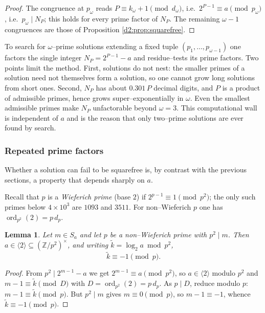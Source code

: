 \documentclass[a4paper]{article}
\theoremstyle{plain}
\newtheorem{lemma}{Lemma}[subsection]
\theoremstyle{definition}
\theoremstyle{remark}
\newcommand{\Z}{\mathbb{Z}}
\newcommand{\ord}{\operatorname{ord}}
\newcommand{\dvd}{\mid}
\newcommand{\Sa}{S_a}
\begin{document}
\begin{proof}
The congruence at $p_\omega$ reads $P\equiv k_\omega+1\pmod{d_\omega}$, i.e.\ $2^{P-1}\equiv a\pmod{p_\omega}$, i.e.\ $p_\omega\dvd N_P$; this holds for every prime factor of $N_P$. The remaining $\omega-1$ congruences are those of Proposition \ref{d2:prop:squarefree}.
\end{proof}

To search for $\omega$--prime solutions extending a fixed tuple $(p_1,\dots,p_{\omega-1})$ one factors the single integer $N_P=2^{P-1}-a$ and residue--tests its prime factors. Two points limit the method. First, solutions do not nest: the smaller primes of a solution need not themselves form a solution, so one cannot grow long solutions from short ones. Second, $N_P$ has about $0.301\,P$ decimal digits, and $P$ is a product of admissible primes, hence grows super--exponentially in $\omega$. Even the smallest admissible primes make $N_P$ unfactorable beyond $\omega=3$. This computational wall is independent of $a$ and is the reason that only two--prime solutions are ever found by search.

\subsubsection{Repeated prime factors}\label{d2:sec:repeated}

Whether a solution can fail to be squarefree is, by contrast with the previous sections, a property that depends sharply on $a$.

Recall that $p$ is a \emph{Wieferich prime} (base $2$) if $2^{p-1}\equiv1\pmod{p^{2}}$; the only such primes below $4\times10^{3}$ are $1093$ and $3511$. For non--Wieferich $p$ one has $\ord_{p^{2}}(2)=p\,d_p$.

\begin{lemma}\label{d2:lem:wieferich}
Let $m\in\Sa$ and let $p$ be a non--Wieferich prime with $p^{2}\dvd m$. Then $a\in\langle2\rangle\subseteq(\Z/p^{2})^{\times}$, and writing $\widetilde k=\log_2a\bmod p^{2}$,
\[
\widetilde k\equiv-1\pmod p.
\]
\end{lemma}

\begin{proof}
From $p^{2}\dvd2^{m-1}-a$ we get $2^{m-1}\equiv a\pmod{p^{2}}$, so $a\in\langle2\rangle$ modulo $p^{2}$ and $m-1\equiv\widetilde k\pmod{D}$ with $D=\ord_{p^{2}}(2)=p\,d_p$. As $p\dvd D$, reduce modulo $p$: $m-1\equiv\widetilde k\pmod p$. But $p^{2}\dvd m$ gives $m\equiv0\pmod p$, so $m-1\equiv-1$, whence $\widetilde k\equiv-1\pmod p$.
\end{proof}
\end{document}
